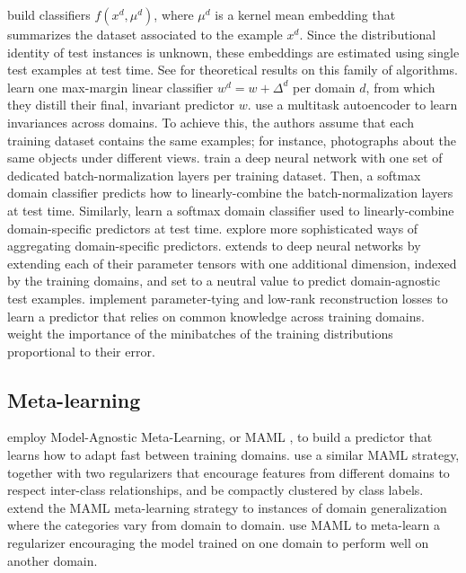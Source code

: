 \documentclass{article}
\begin{document}
\citet{blanchard2011generalizing} build classifiers $f(x^d, \mu^d)$, where $\mu^d$ is a kernel mean embedding \citep{muandet2017kernel} that summarizes the dataset associated to the example $x^d$. Since the distributional identity of test instances is unknown, these embeddings are estimated using single test examples at test time. See \citet{blanchard2017domain, deshmukh2019generalization} for theoretical results on this family of algorithms.
%
\citet{khosla2012undoing} learn one max-margin linear classifier $w^d = w + \Delta^d$ per domain $d$, from which they distill their final, invariant predictor $w$.
%
\citet{ghifary2015domain} use a multitask autoencoder to learn invariances across domains. To achieve this, the authors assume that each training dataset contains the same examples; for instance, photographs about the same objects under different views.
%
\citet{mancini2018robust} train a deep neural network with one set of dedicated batch-normalization layers \citep{ioffe2015batch} per training dataset. Then, a softmax domain classifier predicts how to linearly-combine the batch-normalization layers at test time.
%
Similarly, \citet{mancini2018best} learn a softmax domain classifier used to linearly-combine domain-specific predictors at test time.
%
\citet{d2018domain} explore more sophisticated ways of aggregating domain-specific predictors. 
%
\citet{Li_2017_ICCV} extends \citet{khosla2012undoing} to deep neural networks by extending each of their parameter tensors with one additional dimension, indexed by the training domains, and set to a neutral value to predict domain-agnostic test examples.
%
\citet{ding2017deep} implement parameter-tying and low-rank reconstruction losses to learn a predictor that relies on common knowledge across training domains.
%
\citet{hu2016does, sagawa2019distributionally} weight the importance of the minibatches of the training distributions proportional to their error.

\subsection{Meta-learning}

\citet{li2018learning} employ Model-Agnostic Meta-Learning, or MAML \citep{finn2017model}, to build a predictor that learns how to adapt fast between training domains.
%
\citet{dou2019domain} use a similar MAML strategy, together with two regularizers that encourage  features from different domains to respect inter-class relationships, and be compactly clustered by class labels.
%
\citet{li2019feature} extend the MAML meta-learning strategy to instances of domain generalization where the categories vary from domain to domain.
%
\citet{balaji2018metareg} use MAML to meta-learn a regularizer encouraging the model trained on one domain to perform well on another domain.
\end{document}

